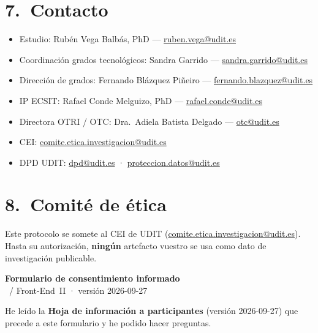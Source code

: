 \documentclass[11pt,a4paper]{scrartcl}
\begin{document}
\section*{7.\ Contacto}

\begin{itemize}
  \item Estudio: Rubén Vega Balbás, PhD ---
        \href{mailto:ruben.vega@udit.es}{ruben.vega@udit.es}
  \item Coordinación grados tecnológicos: Sandra Garrido ---
        \href{mailto:sandra.garrido@udit.es}{sandra.garrido@udit.es}
  \item Dirección de grados: Fernando Blázquez Piñeiro ---
        \href{mailto:fernando.blazquez@udit.es}{fernando.blazquez@udit.es}
  \item IP ECSIT: Rafael Conde Melguizo, PhD ---
        \href{mailto:rafael.conde@udit.es}{rafael.conde@udit.es}
  \item Directora OTRI / OTC: Dra.\ Adiela Batista Delgado ---
        \href{mailto:otc@udit.es}{otc@udit.es}
  \item CEI:
        \href{mailto:comite.etica.investigacion@udit.es}{comite.etica.investigacion@udit.es}
  \item DPD UDIT:
        \href{mailto:dpd@udit.es}{dpd@udit.es} ·
        \href{mailto:proteccion.datos@udit.es}{proteccion.datos@udit.es}
\end{itemize}

\section*{8.\ Comité de ética}

Este protocolo se somete al CEI de UDIT
(\href{mailto:comite.etica.investigacion@udit.es}{comite.etica.investigacion@udit.es}).
Hasta su autorización, \textbf{ningún} artefacto vuestro se usa
como dato de investigación publicable.

\newpage
\LogoRow

\begin{center}
  {\Large\sffamily\bfseries Formulario de consentimiento informado}\\[0.35em]
  {\normalsize\sffamily \TTODfull\ / Front-End~II · versión 2026-09-27}
\end{center}

\vspace{0.4em}
\noindent
He leído la \textbf{Hoja de información a participantes} (versión 2026-09-27)
que precede a este formulario y he podido hacer preguntas.
\end{document}
